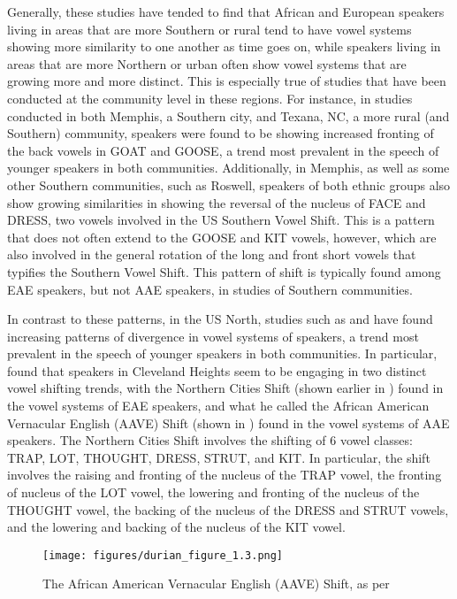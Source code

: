 \documentclass[output=paper,colorlinks,citecolor=brown]{langscibook}
\begin{document}
  Generally, these studies have tended to find that African and European speakers living in areas that are more Southern or rural tend to have vowel systems showing more similarity to one another as time goes on, while speakers living in areas that are more Northern or urban often show vowel systems that are growing more and more distinct. This is especially true of studies that have been conducted at the community level in these regions. For instance, in studies conducted in both Memphis, a Southern city, and Texana, NC, a more rural (and Southern) community, speakers were found to be showing increased fronting of the back vowels in GOAT and GOOSE, a trend most prevalent in the speech of younger speakers in both communities. Additionally, in Memphis, as well as some other Southern communities, such as Roswell, speakers of both ethnic groups also show growing similarities in showing the reversal of the nucleus of FACE and DRESS, two vowels involved in the US Southern Vowel Shift. This is a pattern that does not often extend to the GOOSE and KIT vowels, however, which are also involved in the general rotation of the long and front short vowels that typifies the Southern Vowel Shift. This pattern of shift is typically found among EAE speakers, but not AAE speakers, in studies of Southern communities.

  In contrast to these patterns, in the US North, studies such as \citet{Thomas2007phonological} and \citet{Gordon2000} have found increasing patterns of divergence in vowel systems of speakers, a trend most prevalent in the speech of younger speakers in both communities. In particular, \citet{Thomas2007phonological} found that speakers in Cleveland Heights seem to be engaging in two distinct vowel shifting trends, with the Northern Cities Shift (shown earlier in ) found in the vowel systems of EAE speakers, and what he called the African American Vernacular English (AAVE) Shift (shown in ) found in the vowel systems of AAE speakers. The Northern Cities Shift involves the shifting of 6 vowel classes: TRAP, LOT, THOUGHT, DRESS, STRUT, and KIT. In particular, the shift involves the raising and fronting of the nucleus of the TRAP vowel, the fronting of nucleus of the LOT vowel, the lowering and fronting of the nucleus of the THOUGHT vowel, the backing of the nucleus of the DRESS and STRUT vowels, and the lowering and backing of the nucleus of the KIT vowel.

\begin{figure}
\texttt{[image: figures/durian\_figure\_1.3.png]}
\caption{The African American Vernacular English (AAVE) Shift, as per \citet{Thomas2007phonological}}
\label{fig:durian:3}
 \end{figure}
\end{document}
